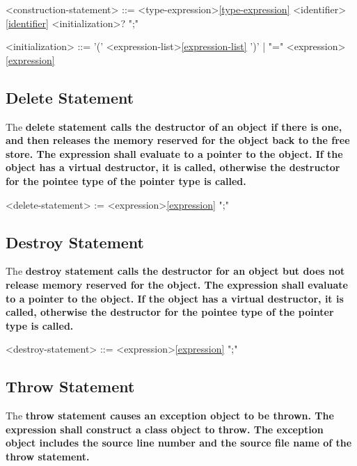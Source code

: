 \documentclass[a4paper,oneside,11pt]{article}
\begin{document}
\begin{grammar}
\label{construction-statement}<construction-statement> ::= <type-expression>\ref{type-expression} <identifier>\ref{identifier} <initialization>? ";"

<initialization> ::= '(' <expression-list>\ref{expression-list} ')' | "=" <expression>\ref{expression}
\end{grammar}

\subsection{Delete Statement}

The \bf{delete} statement calls the destructor of an object if there is one, and then releases the memory reserved for the object back to the free store.
The expression shall evaluate to a pointer to the object.
If the object has a virtual destructor, it is called, otherwise the destructor for the pointee type of the pointer type is called.

\begin{grammar}
\label{delete-statement}<delete-statement> :=  <expression>\ref{expression} ";"
\end{grammar}

\subsection{Destroy Statement}

The \bf{destroy} statement calls the destructor for an object but does not release memory reserved for the object.
The expression shall evaluate to a pointer to the object.
If the object has a virtual destructor, it is called, otherwise the destructor for the pointee type of the pointer type is called.

\begin{grammar}
\label{destroy-statement}<destroy-statement> ::=  <expression>\ref{expression} ";"
\end{grammar}

\subsection{Throw Statement}

The \bf{throw} statement causes an exception object to be thrown. The expression shall construct a class object to throw.
The exception object includes the source line number and the source file name of the throw statement.
\end{document}
